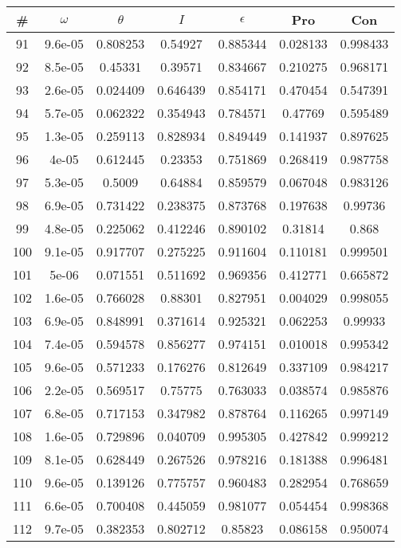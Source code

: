 \newpage
\begin{table}
\begin{tabular}{c|c|c|c|c|c|c}
\# & $\omega$ & $\theta$ & $I$ & $\epsilon$ & Pro & Con\\
\hline
91 & 9.6e-05 & 0.808253 & 0.54927 & 0.885344 & 0.028133 & 0.998433\\
92 & 8.5e-05 & 0.45331 & 0.39571 & 0.834667 & 0.210275 & 0.968171\\
93 & 2.6e-05 & 0.024409 & 0.646439 & 0.854171 & 0.470454 & 0.547391\\
94 & 5.7e-05 & 0.062322 & 0.354943 & 0.784571 & 0.47769 & 0.595489\\
95 & 1.3e-05 & 0.259113 & 0.828934 & 0.849449 & 0.141937 & 0.897625\\
96 & 4e-05 & 0.612445 & 0.23353 & 0.751869 & 0.268419 & 0.987758\\
97 & 5.3e-05 & 0.5009 & 0.64884 & 0.859579 & 0.067048 & 0.983126\\
98 & 6.9e-05 & 0.731422 & 0.238375 & 0.873768 & 0.197638 & 0.99736\\
99 & 4.8e-05 & 0.225062 & 0.412246 & 0.890102 & 0.31814 & 0.868\\
100 & 9.1e-05 & 0.917707 & 0.275225 & 0.911604 & 0.110181 & 0.999501\\
101 & 5e-06 & 0.071551 & 0.511692 & 0.969356 & 0.412771 & 0.665872\\
102 & 1.6e-05 & 0.766028 & 0.88301 & 0.827951 & 0.004029 & 0.998055\\
103 & 6.9e-05 & 0.848991 & 0.371614 & 0.925321 & 0.062253 & 0.99933\\
104 & 7.4e-05 & 0.594578 & 0.856277 & 0.974151 & 0.010018 & 0.995342\\
105 & 9.6e-05 & 0.571233 & 0.176276 & 0.812649 & 0.337109 & 0.984217\\
106 & 2.2e-05 & 0.569517 & 0.75775 & 0.763033 & 0.038574 & 0.985876\\
107 & 6.8e-05 & 0.717153 & 0.347982 & 0.878764 & 0.116265 & 0.997149\\
108 & 1.6e-05 & 0.729896 & 0.040709 & 0.995305 & 0.427842 & 0.999212\\
109 & 8.1e-05 & 0.628449 & 0.267526 & 0.978216 & 0.181388 & 0.996481\\
110 & 9.6e-05 & 0.139126 & 0.775757 & 0.960483 & 0.282954 & 0.768659\\
111 & 6.6e-05 & 0.700408 & 0.445059 & 0.981077 & 0.054454 & 0.998368\\
112 & 9.7e-05 & 0.382353 & 0.802712 & 0.85823 & 0.086158 & 0.950074\\

\end{tabular}
\end{table}

